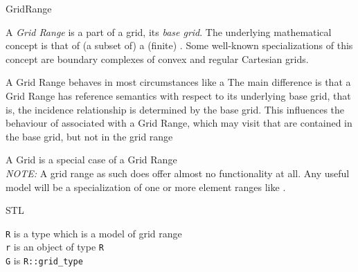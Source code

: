 \begin{Label}{GridRange}  
\end{Label}

    A {\em  Grid Range} is a part of a grid, its {\em  base grid}.
    The underlying mathematical concept
    is that of (a subset of) a (finite) 
    .
    Some well-known specializations of this concept are
    boundary complexes of convex 
    and regular Cartesian grids.

    A Grid Range behaves in most circumstances like a 
    The main difference is that a Grid Range has reference semantics with respect to
    its underlying base grid, that is, the incidence relationship is determined by the 
    base grid.
    This influences the behaviour of
    associated with a Grid Range,
    which may  visit 
    that are contained in the base grid,
    but not  in the grid range    
    
    A Grid is a special case of a Grid 
    Range  %
    \W\\
    {\em  NOTE:} A grid range as such does offer almost no functionality at all.
    Any useful model will be a specialization of one or more 
    element ranges 
    like     
    .

     STL 


    {\tt  R} is a type which is a model of grid range
    \\
    {\tt  r} is an object of type {\tt  R}
    \\
    {\tt G} is {\tt R::grid\_type}


